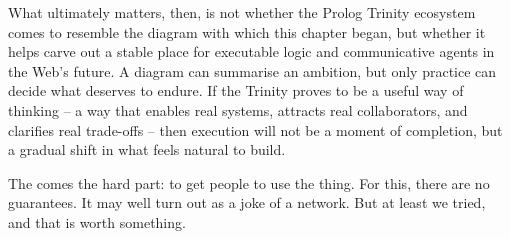 What ultimately matters, then, is not whether the Prolog Trinity ecosystem comes to resemble the diagram with which this chapter began, but whether it helps carve out a stable place for executable logic and communicative agents in the Web's future. A diagram can summarise an ambition, but only practice can decide what deserves to endure. If the Trinity proves to be a useful way of thinking -- a way that enables real systems, attracts real collaborators, and clarifies real trade-offs -- then execution will not be a moment of completion, but a gradual shift in what feels natural to build.

\medskip
\noindent The comes the hard part: to get people to use the thing. For this, there are no guarantees. It may well turn out as a joke of a network. But at least we tried, and that is worth something.

%
%
%
%
%
%
%
%
%
%
